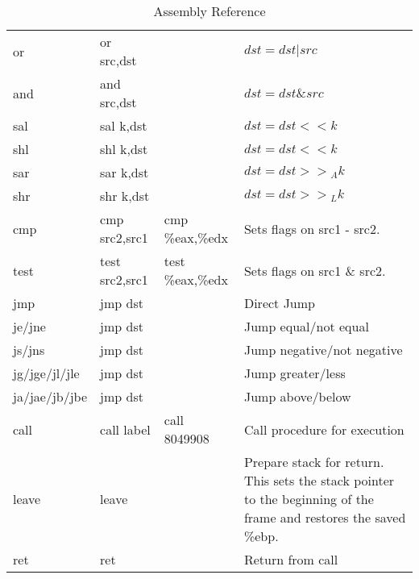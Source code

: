 \begin{table}
\begin{tabular}{| p{} | l | l | p{} |}
        {\ttfamily or}              & {\ttfamily or src,dst}     &                                           & $ dst = dst | src $\\
        {\ttfamily and}             & {\ttfamily and src,dst}    &                                           & $ dst = dst \& src $\\
        {\ttfamily sal}             & {\ttfamily sal k,dst}      &                                           & $ dst = dst << k $\\
        {\ttfamily shl}             & {\ttfamily shl k,dst}      &                                           & $ dst = dst << k$\\
        {\ttfamily sar}             & {\ttfamily sar k,dst}      &                                           & $ dst = dst {>>}_A k $\\
        {\ttfamily shr}             & {\ttfamily shr k,dst}      &                                           & $ dst = dst {>>}_L k $\\
        \hline
        {\ttfamily cmp}             & {\ttfamily cmp src2,src1}  & {\ttfamily cmp \%eax,\%edx}               & Sets flags on {\ttfamily src1 - src2}.\\
        {\ttfamily test}            & {\ttfamily test src2,src1} & {\ttfamily test \%eax,\%edx}              & Sets flags on {\ttfamily src1 \& src2}.\\
        \hline
        {\ttfamily jmp}             & {\ttfamily jmp dst}        &                                           & Direct Jump\\
        {\ttfamily je/jne}          & {\ttfamily jmp dst}        &                                           & Jump equal/not equal\\
        {\ttfamily js/jns}          & {\ttfamily jmp dst}        &                                           & Jump negative/not negative\\
        {\ttfamily jg/jge/jl/jle}   & {\ttfamily jmp dst}        &                                           & Jump greater/less\\
        {\ttfamily ja/jae/jb/jbe}   & {\ttfamily jmp dst}        &                                           & Jump above/below\\
        \hline
        {\ttfamily call}            & {\ttfamily call label}     & {\ttfamily call 8049908}                  & Call procedure for execution\\
        {\ttfamily leave}           & {\ttfamily leave}          &                                           & Prepare stack for return. This sets the stack pointer to the beginning of the frame and restores the saved {\ttfamily \%ebp}.\\
        {\ttfamily ret}             & {\ttfamily ret}            &                                           & Return from call\\
        \hline
    \end{tabular}
    \label{table:assembly}
    \caption{Assembly Reference}
\end{table}
